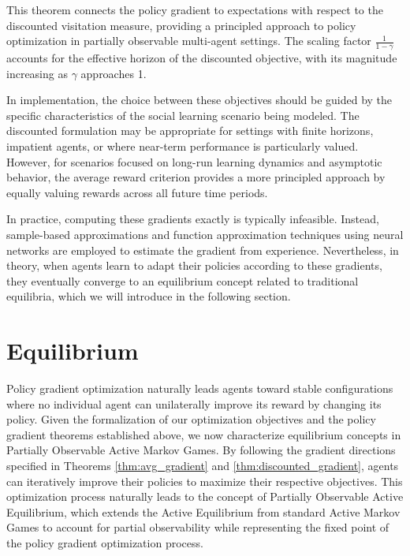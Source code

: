 This theorem connects the policy gradient to expectations with respect to the discounted visitation measure, providing a principled approach to policy optimization in partially observable multi-agent settings. The scaling factor $\frac{1}{1-\gamma}$ accounts for the effective horizon of the discounted objective, with its magnitude increasing as $\gamma$ approaches 1.

In implementation, the choice between these objectives should be guided by the specific characteristics of the social learning scenario being modeled. The discounted formulation may be appropriate for settings with finite horizons, impatient agents, or where near-term performance is particularly valued. However, for scenarios focused on long-run learning dynamics and asymptotic behavior, the average reward criterion provides a more principled approach by equally valuing rewards across all future time periods.

In practice, computing these gradients exactly is typically infeasible. Instead, sample-based approximations and function approximation techniques using neural networks are employed to estimate the gradient from experience. Nevertheless, in theory, when agents learn to adapt their policies according to these gradients, they eventually converge to an equilibrium concept related to traditional equilibria, which we will introduce in the following section.

\section{Equilibrium}
Policy gradient optimization naturally leads agents toward stable configurations where no individual agent can unilaterally improve its reward by changing its policy. Given the formalization of our optimization objectives and the policy gradient theorems established above, we now characterize equilibrium concepts in Partially Observable Active Markov Games. By following the gradient directions specified in Theorems \ref{thm:avg_gradient} and \ref{thm:discounted_gradient}, agents can iteratively improve their policies to maximize their respective objectives. This optimization process naturally leads to the concept of Partially Observable Active Equilibrium, which extends the Active Equilibrium from standard Active Markov Games \cite{kim2022influencing} to account for partial observability while representing the fixed point of the policy gradient optimization process.

